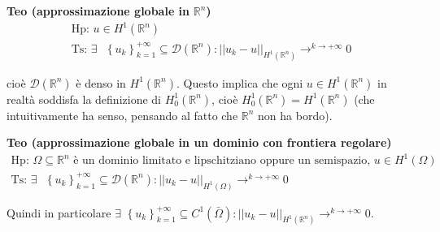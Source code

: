 \documentclass{article}
\begin{document}
\textbf{Teo (approssimazione globale in }$%
\mathbb{R}
^{n}$\textbf{)}%
\begin{gather*}
\text{Hp}\text{: }u\in H^{1}\left( 
\mathbb{R}
^{n}\right) \\
\text{Ts}\text{: }\exists \text{ }\left\{ u_{k}\right\} _{k=1}^{+\infty
}\subseteq \mathcal{D}\left( 
\mathbb{R}
^{n}\right) :\left\vert \left\vert u_{k}-u\right\vert \right\vert
_{H^{1}\left( 
\mathbb{R}
^{n}\right) }\rightarrow ^{k\rightarrow +\infty }0
\end{gather*}

cio\`{e} $\mathcal{D}\left( 
\mathbb{R}
^{n}\right) $ \`{e} denso in $H^{1}\left( 
\mathbb{R}
^{n}\right) $. Questo implica che ogni $u\in H^{1}\left( 
\mathbb{R}
^{n}\right) $ in realt\`{a} soddisfa la definizione di $H_{0}^{1}\left( 
\mathbb{R}
^{n}\right) $, cio\`{e} $H_{0}^{1}\left( 
\mathbb{R}
^{n}\right) =H^{1}\left( 
\mathbb{R}
^{n}\right) $ (che intuitivamente ha senso, pensando al fatto che $%
\mathbb{R}
^{n}$ non ha bordo).

\textbf{Teo (approssimazione globale in un dominio con frontiera regolare)}%
\begin{gather*}
\text{Hp}\text{: }\Omega \subseteq 
\mathbb{R}
^{n}\text{ \`{e} un dominio limitato e lipschitziano oppure un semispazio, }%
u\in H^{1}\left( \Omega \right) \\
\text{Ts}\text{: }\exists \text{ }\left\{ u_{k}\right\} _{k=1}^{+\infty
}\subseteq \mathcal{D}\left( 
\mathbb{R}
^{n}\right) :\left\vert \left\vert u_{k}-u\right\vert \right\vert
_{H^{1}\left( \Omega \right) }\rightarrow ^{k\rightarrow +\infty }0
\end{gather*}

Quindi in particolare $\exists $ $\left\{ u_{k}\right\} _{k=1}^{+\infty
}\subseteq C^{1}\left( \bar{\Omega}\right) :\left\vert \left\vert
u_{k}-u\right\vert \right\vert _{H^{1}\left( 
\mathbb{R}
^{n}\right) }\rightarrow ^{k\rightarrow +\infty }0$.
\end{document}
